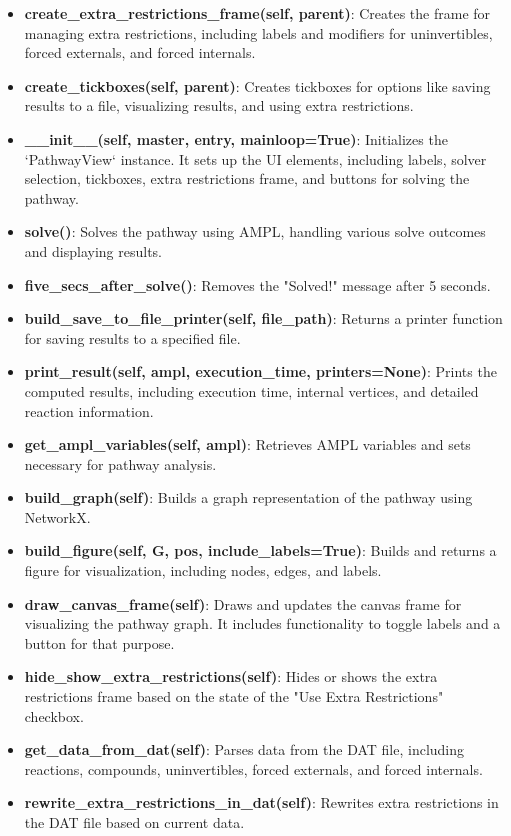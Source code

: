 \begin{itemize}
    \item \textbf{create\_extra\_restrictions\_frame(self, parent)}: Creates the frame for managing extra restrictions, including labels and modifiers for uninvertibles, forced externals, and forced internals.
    \item \textbf{create\_tickboxes(self, parent)}: Creates tickboxes for options like saving results to a file, visualizing results, and using extra restrictions.
    \item \textbf{\_\_init\_\_(self, master, entry, mainloop=True)}: Initializes the `PathwayView` instance. It sets up the UI elements, including labels, solver selection, tickboxes, extra restrictions frame, and buttons for solving the pathway.
    \item \textbf{solve()}: Solves the pathway using AMPL, handling various solve outcomes and displaying results.
    \item \textbf{five\_secs\_after\_solve()}: Removes the "Solved!" message after 5 seconds.
    \item \textbf{build\_save\_to\_file\_printer(self, file\_path)}: Returns a printer function for saving results to a specified file.
    \item \textbf{print\_result(self, ampl, execution\_time, printers=None)}: Prints the computed results, including execution time, internal vertices, and detailed reaction information.
    \item \textbf{get\_ampl\_variables(self, ampl)}: Retrieves AMPL variables and sets necessary for pathway analysis.
    \item \textbf{build\_graph(self)}: Builds a graph representation of the pathway using NetworkX.
    \item \textbf{build\_figure(self, G, pos, include\_labels=True)}: Builds and returns a figure for visualization, including nodes, edges, and labels.
    \item \textbf{draw\_canvas\_frame(self)}: Draws and updates the canvas frame for visualizing the pathway graph. It includes functionality to toggle labels and a button for that purpose.
    \item \textbf{hide\_show\_extra\_restrictions(self)}: Hides or shows the extra restrictions frame based on the state of the "Use Extra Restrictions" checkbox.
    \item \textbf{get\_data\_from\_dat(self)}: Parses data from the DAT file, including reactions, compounds, uninvertibles, forced externals, and forced internals.
    \item \textbf{rewrite\_extra\_restrictions\_in\_dat(self)}: Rewrites extra restrictions in the DAT file based on current data.
\end{itemize}

